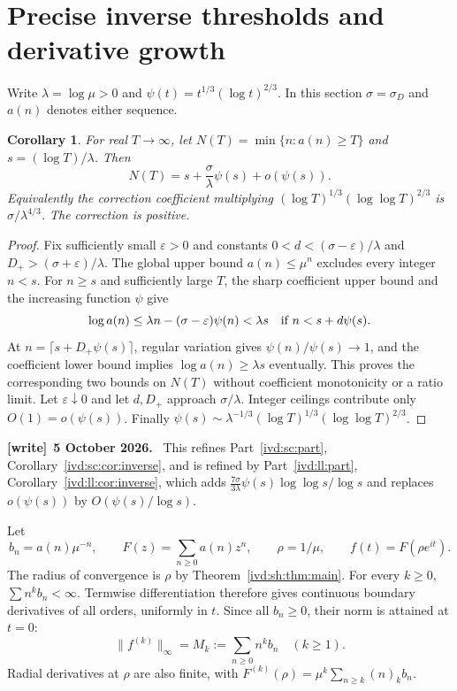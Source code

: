 \documentclass[11pt,letterpaper]{article}
\newtheorem{corollary}[theorem]{Corollary}
\theoremstyle{remark}\newtheorem{remark}[theorem]{Remark}
\numberwithin{equation}{section}
\newenvironment{writenote}[1][]{\par\smallskip\begingroup\small
 \noindent\textbf{[write]}\if\relax\detokenize{#1}\relax\else~\textbf{#1.}\fi\ }%
 {\par\endgroup\smallskip}
\begin{document}
\section{Precise inverse thresholds and derivative growth}\label{ivd:sh:sec:inverse}
Write $\lambda=\log\mu>0$ and $\psi(t)=t^{1/3}(\log t)^{2/3}$.
In this section $\sigma=\sigma_D$ and $a(n)$ denotes either sequence.

\begin{corollary}\label{ivd:sh:cor:inverse}
For real $T\to\infty$, let $N(T)=\min\{n:a(n)\ge T\}$ and
$s=(\log T)/\lambda$. Then
\begin{equation}\label{ivd:sh:eq:inverse}
 N(T)=s+\frac{\sigma}{\lambda}\psi(s)+o(\psi(s)).
\end{equation}
Equivalently the correction coefficient multiplying
$(\log T)^{1/3}(\log\log T)^{2/3}$ is
$\sigma/\lambda^{4/3}$. The correction is positive.
\end{corollary}
\begin{proof}
Fix sufficiently small $\varepsilon>0$ and constants
$0<d<(\sigma-\varepsilon)/\lambda$ and
$D_+>(\sigma+\varepsilon)/\lambda$.
The global upper bound $a(n)\le\mu^n$ excludes every integer $n<s$.
For $n\ge s$ and sufficiently large $T$, the sharp coefficient upper
bound and the increasing function $\psi$ give
\[
 \log a(n)\le\lambda n-(\sigma-\varepsilon)\psi(n)
 <\lambda s\quad\hbox{if }n<s+d\psi(s).
\]
At $n=\lceil s+D_+\psi(s)\rceil$, regular variation gives
$\psi(n)/\psi(s)\to1$, and the coefficient lower bound implies
$\log a(n)\ge\lambda s$ eventually. This proves the corresponding
two bounds on $N(T)$ without coefficient monotonicity or a ratio
limit. Let $\varepsilon\downarrow0$ and let $d,D_+$ approach
$\sigma/\lambda$. Integer ceilings contribute only
$O(1)=o(\psi(s))$. Finally
$\psi(s)\sim\lambda^{-1/3}(\log T)^{1/3}(\log\log T)^{2/3}$.
\end{proof}
\begin{writenote}[5 October 2026]
This refines Part~\ref{ivd:sc:part}, Corollary~\ref{ivd:sc:cor:inverse}, and is refined by Part~\ref{ivd:ll:part}, Corollary~\ref{ivd:ll:cor:inverse}, which adds $\frac{7\sigma}{3\lambda}\psi(s)\log\log s/\log s$ and replaces $o(\psi(s))$ by $O(\psi(s)/\log s)$.
\end{writenote}

Let
\[
 b_n=a(n)\mu^{-n},\qquad F(z)=\sum_{n\ge0}a(n)z^n,
 \qquad\rho=1/\mu,\qquad f(t)=F(\rho e^{it}).
\]
The radius of convergence is $\rho$ by Theorem~\ref{ivd:sh:thm:main}.
For every $k\ge0$, $\sum n^k b_n<\infty$. Termwise differentiation
therefore gives continuous boundary derivatives of all orders,
uniformly in $t$. Since all $b_n\ge0$, their norm is attained at
$t=0$:
\begin{equation}\label{ivd:sh:eq:momentnorm}
 \|f^{(k)}\|_\infty=M_k:=\sum_{n\ge0}n^k b_n\quad(k\ge1).
\end{equation}
Radial derivatives at $\rho$ are also finite, with
$F^{(k)}(\rho)=\mu^k\sum_{n\ge k}(n)_k b_n$.
\end{document}

